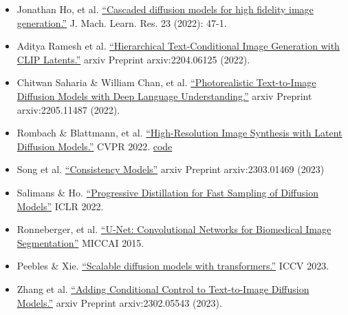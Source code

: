 \documentclass[12pt]{article}
\begin{document}
\begin{itemize}
    \item [12] Jonathan Ho, et al. \href{https://arxiv.org/abs/2106.15282}{“Cascaded diffusion models for high fidelity image generation.”} J. Mach. Learn. Res. 23 (2022): 47-1.
    \item [13] Aditya Ramesh et al. \href{https://arxiv.org/abs/2204.06125}{“Hierarchical Text-Conditional Image Generation with CLIP Latents.”} arxiv Preprint arxiv:2204.06125 (2022).
    \item [14] Chitwan Saharia \& William Chan, et al. \href{https://arxiv.org/abs/2205.11487}{“Photorealistic Text-to-Image Diffusion Models with Deep Language Understanding.”} arxiv Preprint arxiv:2205.11487 (2022).
    \item [15] Rombach \& Blattmann, et al. \href{https://arxiv.org/abs/2112.10752}{“High-Resolution Image Synthesis with Latent Diffusion Models.”} CVPR 2022. \href{https://github.com/CompVis/latent-diffusion}{code}
    \item [16] Song et al. \href{https://arxiv.org/abs/2303.01469}{“Consistency Models”} arxiv Preprint arxiv:2303.01469 (2023)
    \item [17] Salimans \& Ho. \href{https://arxiv.org/abs/2202.00512}{“Progressive Distillation for Fast Sampling of Diffusion Models”} ICLR 2022.
    \item [18] Ronneberger, et al. \href{https://arxiv.org/abs/1505.04597}{“U-Net: Convolutional Networks for Biomedical Image Segmentation”} MICCAI 2015.
    \item [19] Peebles \& Xie. \href{https://arxiv.org/abs/2212.09748}{“Scalable diffusion models with transformers.”} ICCV 2023.
    \item [20] Zhang et al. \href{https://arxiv.org/abs/2302.05543}{“Adding Conditional Control to Text-to-Image Diffusion Models.”} arxiv Preprint arxiv:2302.05543 (2023).
\end{itemize}

\n
\end{document}
